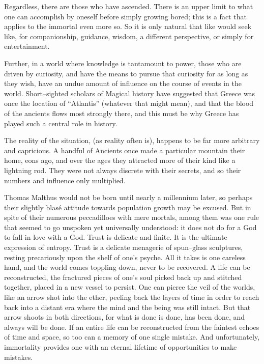 Regardless, there are those who have ascended. There is an upper limit to what one can accomplish by oneself before simply growing bored; this is a fact that applies to the immortal even more so. So it is only natural that like would seek like, for companionship, guidance, wisdom, a different perspective, or simply for entertainment.

Further, in a world where knowledge is tantamount to power, those who are driven by curiosity, and have the means to pursue that curiosity for as long as they wish, have an undue amount of influence on the course of events in the world. Short\mbox{--}sighted scholars of Magical history have suggested that Greece was once the location of “Atlantis” (whatever that might mean), and that the blood of the ancients flows most strongly there, and this must be why Greece has played such a central role in history.

The reality of the situation, (as reality often is), happens to be far more arbitrary and capricious. A handful of Ancients once made a particular mountain their home, eons ago, and over the ages they attracted more of their kind like a lightning rod. They were not always discrete with their secrets, and so their numbers and influence only multiplied.

Thomas Malthus would not be born until nearly a millennium later, so perhaps their slightly blasé attitude towards population growth may be excused. But in spite of their numerous peccadilloes with mere mortals, among them was one rule that seemed to go unspoken yet universally understood: it does not do for a God to fall in love with a God.
\SmallVSpace
Trust is delicate and finite. It is the ultimate expression of entropy. Trust is a delicate menagerie of spun\mbox{--}glass sculptures, resting precariously upon the shelf of one’s psyche. All it takes is one careless hand, and the world comes toppling down, never to be recovered.
\SmallVSpace
A life can be reconstructed, the fractured pieces of one’s soul picked back up and stitched together, placed in a new vessel to persist. One can pierce the veil of the worlds, like an arrow shot into the ether, peeling back the layers of time in order to reach back into a distant era where the mind and the being was still intact. But that arrow shoots in both directions, for what is done is done, has been done, and always will be done. If an entire life can be reconstructed from the faintest echoes of time and space, so too can a memory of one single mistake.
\SomeVSpace
And unfortunately, immortality provides one with an eternal lifetime of opportunities to make mistakes.

